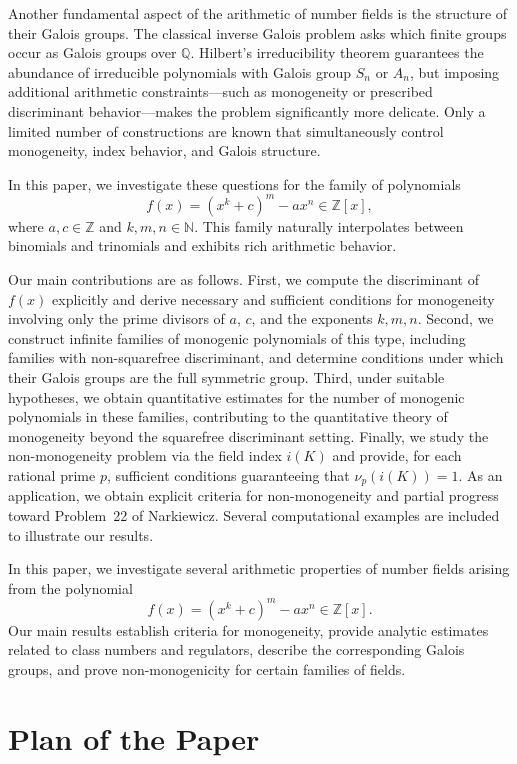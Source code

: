 \documentclass[table]{amsart}
\numberwithin{equation}{section}
\begin{document}
Another fundamental aspect of the arithmetic of number fields is the structure of their Galois groups.
The classical inverse Galois problem asks which finite groups occur as Galois groups over $\mathbb{Q}$.
Hilbert’s irreducibility theorem guarantees the abundance of irreducible polynomials with Galois group $S_n$ or $A_n$, but imposing additional arithmetic constraints—such as monogeneity or prescribed discriminant behavior—makes the problem significantly more delicate.
Only a limited number of constructions are known that simultaneously control monogeneity, index behavior, and Galois structure.

\medskip

In this paper, we investigate these questions for the family of polynomials
\[
f(x)=(x^k+c)^m-ax^n\in\mathbb{Z}[x],
\]
where $a,c\in\mathbb{Z}$ and $k,m,n\in\mathbb{N}$.
This family naturally interpolates between binomials and trinomials and exhibits rich arithmetic behavior.

Our main contributions are as follows.
First, we compute the discriminant of $f(x)$ explicitly and derive necessary and sufficient conditions for monogeneity involving only the prime divisors of $a$, $c$, and the exponents $k,m,n$.
Second, we construct infinite families of monogenic polynomials of this type, including families with non-squarefree discriminant, and determine conditions under which their Galois groups are the full symmetric group.
Third, under suitable hypotheses, we obtain quantitative estimates for the number of monogenic polynomials in these families, contributing to the quantitative theory of monogeneity beyond the squarefree discriminant setting.
Finally, we study the non-monogeneity problem via the field index $i(K)$ and provide, for each rational prime $p$, sufficient conditions guaranteeing that $\nu_p(i(K))=1$.
As an application, we obtain explicit criteria for non-monogeneity and partial progress toward Problem~22 of Narkiewicz.
Several computational examples are included to illustrate our results.

\fi

\iffalse
In this paper, we investigate several arithmetic properties of number fields arising from the polynomial
\[
f(x) = (x^k + c)^m - a x^n \in \mathbb{Z}[x].
\]
Our main results establish criteria for monogeneity, provide analytic estimates related to class numbers and regulators, describe the corresponding Galois groups, and prove non-monogenicity for certain families of fields.

\section{Plan of the Paper}
\end{document}
